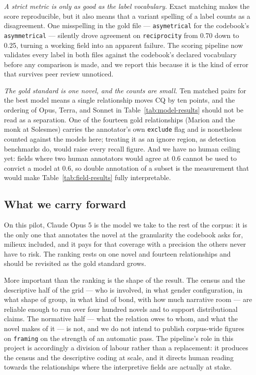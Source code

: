 \emph{A strict metric is only as good as the label vocabulary.} Exact matching makes
the score reproducible, but it also means that a variant spelling of a label counts
as a disagreement. One misspelling in the gold file --- \texttt{asymetrical} for the
codebook's \texttt{asymmetrical} --- silently drove agreement on
\texttt{reciprocity} from 0.70 down to 0.25, turning a working field into an apparent
failure. The scoring pipeline now validates every label in both files against the
codebook's declared vocabulary before any comparison is made, and we report this
because it is the kind of error that survives peer review unnoticed.

\emph{The gold standard is one novel, and the counts are small.} Ten matched pairs
for the best model means a single relationship moves CQ by ten points, and the
ordering of Opus, Terra, and Sonnet in Table~\ref{tab:model-results} should not be
read as a separation. One of the fourteen gold relationships (Marion and the monk at
Solesmes) carries the annotator's own \texttt{exclude} flag and is nonetheless
counted against the models here; treating it as an ignore region, as detection
benchmarks do, would raise every recall figure. And we have no human ceiling yet:
fields where two human annotators would agree at 0.6 cannot be used to convict a
model at 0.6, so double annotation of a subset is the measurement that would make
Table~\ref{tab:field-results} fully interpretable.

\subsection{What we carry forward}

On this pilot, Claude Opus 5 is the model we take to the rest of the corpus: it is
the only one that annotates the novel at the granularity the codebook asks for,
milieux included, and it pays for that coverage with a precision the others never
have to risk. The ranking rests on one novel and fourteen relationships and should be
revisited as the gold standard grows.

More important than the ranking is the shape of the result. The census and the
descriptive half of the grid --- who is involved, in what gender configuration, in
what shape of group, in what kind of bond, with how much narrative room --- are
reliable enough to run over four hundred novels and to support distributional claims.
The normative half --- what the relation owes to whom, and what the novel makes of it
--- is not, and we do not intend to publish corpus-wide figures on
\texttt{framing} on the strength of an automatic pass. The pipeline's role in this
project is accordingly a division of labour rather than a replacement: it produces
the census and the descriptive coding at scale, and it directs human reading towards
the relationships where the interpretive fields are actually at stake.
